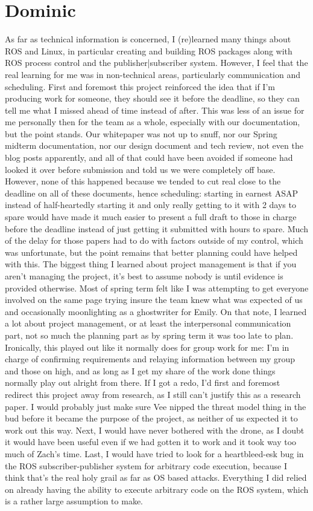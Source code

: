 \documentclass[IEEEtran,letterpaper,10pt,notitlepage,draftclsnofoot,onecolumn]{article}
\begin{document}
\section{Dominic}
As far as technical information is concerned, I (re)learned many
things about ROS and Linux, in particular creating and building 
ROS packages along with ROS process control and the publisher|subscriber 
system. However, I feel that the real learning for me was in 
non-technical areas, particularly communication and scheduling. First 
and foremost this project reinforced the idea that if I’m producing 
work for someone, they should see it before the deadline, so they 
can tell me what I missed ahead of time instead of after. This was less 
of an issue for me personally then for the team as a whole, especially 
with our documentation, but the point stands. Our whitepaper was not 
up to snuff, nor our Spring midterm documentation, nor our design document 
and tech review, not even the blog posts apparently, and all of that could 
have been avoided if someone had looked it over before submission and told 
us we were completely off base. However, none of this happened because we 
tended to cut real close to the deadline on all of these documents, hence 
scheduling: starting in earnest ASAP instead of half-heartedly starting it 
and only really getting to it with 2 days to spare would have made it much 
easier to present a full draft to those in charge before the deadline instead 
of just getting it submitted with hours to spare. Much of the delay for those 
papers had to do with factors outside of my control, which was unfortunate, but 
the point remains that better planning could have helped with this. The biggest 
thing I learned about project management is that if you aren’t managing the 
project, it’s best to assume nobody is until evidence is provided otherwise. 
Most of spring term felt like I was attempting to get everyone involved on the 
same page trying insure the team knew what was expected of us and occasionally 
moonlighting as a ghostwriter for Emily. On that note, I learned a lot about 
project management, or at least the interpersonal communication part, not so 
much the planning part as by spring term it was too late to plan. Ironically, 
this played out like it normally does for group work for me: I’m in charge of 
confirming requirements and relaying information between my group and those on 
high, and as long as I get my share of the work done things normally play out 
alright from there. If I got a redo, I’d first and foremost redirect this
project away from research, as I still can’t justify this as a research paper.
I would probably just make sure Vee nipped the threat model thing in the bud 
before it became the purpose of the project, as neither of us expected it to 
work out this way. Next, I would have never bothered with the drone, as I doubt 
it would have been useful even if we had gotten it to work and it took way too 
much of Zach’s time. Last, I would have tried to look for a heartbleed-esk bug 
in the ROS subscriber-publisher system for arbitrary code execution, because I 
think that’s the real holy grail as far as OS based attacks. Everything I did 
relied on already having the ability to execute arbitrary code on the ROS 
system, which is a rather large assumption to make.
\end{document}
